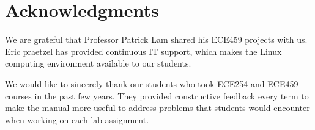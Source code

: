 
\section*{Acknowledgments}

We are grateful that Professor Patrick Lam shared his ECE459  projects with us. Eric praetzel has provided continuous IT support, which makes the Linux computing environment available to our students.

We would like to sincerely thank our students who took ECE254 and ECE459 courses in the past few years. They provided constructive feedback every term to make the manual more useful to address problems that students would encounter when working on each lab assignment. 

